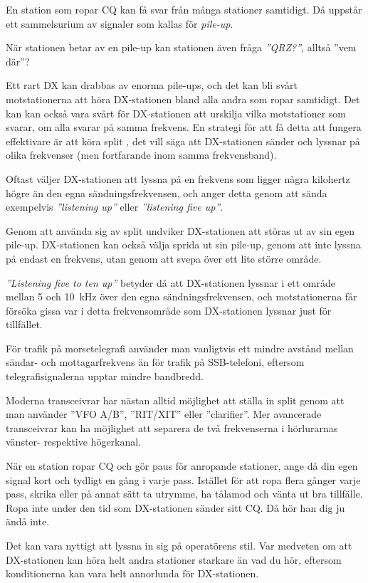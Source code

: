 En station som ropar CQ kan få svar från många stationer samtidigt.
Då uppstår ett sammelsurium av signaler som kallas för \emph{pile-up}.

När stationen betar av en pile-up kan stationen även fråga \emph{''QRZ?''},
alltså ''vem där''?

Ett rart DX kan drabbas av enorma pile-ups, och det kan bli svårt
motstationerna att höra DX-stationen bland alla andra som ropar samtidigt.
Det kan kan också vara svårt för DX-stationen att urskilja vilka motstationer
som svarar, om alla svarar på samma frekvens.
En strategi för att få detta att fungera effektivare är att köra split
\cite{LowBandDX}, det vill säga att DX-stationen sänder och lyssnar på olika
frekvenser (men fortfarande inom samma frekvensband).

Oftast väljer DX-stationen att lyssna på en frekvens som ligger några kilohertz
högre än den egna sändningsfrekvensen, och anger detta genom att sända
exempelvis \emph{''listening up''} eller \emph{''listening five up''}.

Genom att använda sig av split undviker DX-stationen att störas ut av sin egen
pile-up.
DX-stationen kan också välja sprida ut sin pile-up, genom att inte lyssna på
endast en frekvens, utan genom att svepa över ett lite större område.

\emph{''Listening five to ten up''} betyder då att DX-stationen lyssnar i ett
område mellan 5 och \SI{10}{\kilo\hertz} över den egna sändningsfrekvensen, och
motstationerna får försöka gissa var i detta frekvensområde som DX-stationen
lyssnar just för tillfället.

För trafik på morsetelegrafi använder man vanligtvis ett mindre avstånd mellan
sändar- och mottagarfrekvens än för trafik på SSB-telefoni, eftersom
telegrafisignalerna upptar mindre bandbredd.

Moderna transceivrar har nästan alltid möjlighet att ställa in split genom att
man använder ''VFO A/B'', ''RIT/XIT'' eller ''clarifier''.
Mer avancerade transceivrar kan ha möjlighet att separera de två frekvenserna i
hörlurarnas vänster- respektive högerkanal.

När en station ropar CQ och gör paus för anropande stationer, ange då din egen
signal kort och tydligt en gång i varje pass.
Istället för att ropa flera gånger varje pass, skrika eller på annat sätt
ta utrymme, ha tålamod och vänta ut bra tillfälle.
Ropa inte under den tid som DX-stationen sänder sitt CQ. Då hör han dig ju ändå inte.

Det kan vara nyttigt att lyssna in sig på operatörens stil.
Var medveten om att DX-stationen kan höra helt andra stationer starkare än vad
du hör, eftersom konditionerna kan vara helt annorlunda för DX-stationen.

